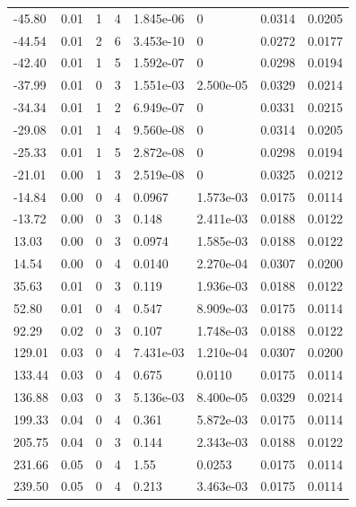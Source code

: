 \documentclass[preview]{standalone}
\begin{document}
{{\begin{tabular}{L{1.2cm}C{1.2cm} C{0.3cm}C{0.5cm} C{1.4cm}C{1.4cm} C{1.4cm}C{1.4cm}}
  -45.80  &  0.01  & 1     &  4 &  1.845e-06  & 0  & 0.0314 &  0.0205   \\ 
  -44.54  &  0.01  & 2     &  6 &  3.453e-10  & 0  & 0.0272 &  0.0177   \\ 
  -42.40  &  0.01  & 1     &  5 &  1.592e-07  & 0  & 0.0298 &  0.0194   \\ 
  -37.99  &  0.01  & 0     &  3 &  1.551e-03  & 2.500e-05  & 0.0329 &  0.0214   \\ 
  -34.34  &  0.01  & 1     &  2 &  6.949e-07  & 0  & 0.0331 &  0.0215   \\ 
  -29.08  &  0.01  & 1     &  4 &  9.560e-08  & 0  & 0.0314 &  0.0205   \\ 
  -25.33  &  0.01  & 1     &  5 &  2.872e-08  & 0  & 0.0298 &  0.0194   \\ 
  -21.01  &  0.00  & 1     &  3 &  2.519e-08  & 0  & 0.0325 &  0.0212   \\ 
  -14.84  &  0.00  & 0     &  4 &  0.0967  & 1.573e-03  & 0.0175 &  0.0114   \\ 
  -13.72  &  0.00  & 0     &  3 &  0.148  & 2.411e-03  & 0.0188 &  0.0122   \\ 
  13.03  &  0.00  & 0     &  3 &  0.0974  & 1.585e-03  & 0.0188 &  0.0122   \\ 
  14.54  &  0.00  & 0     &  4 &  0.0140  & 2.270e-04  & 0.0307 &  0.0200   \\ 
  35.63  &  0.01  & 0     &  3 &  0.119  & 1.936e-03  & 0.0188 &  0.0122   \\ 
  52.80  &  0.01  & 0     &  4 &  0.547  & 8.909e-03  & 0.0175 &  0.0114   \\ 
  92.29  &  0.02  & 0     &  3 &  0.107  & 1.748e-03  & 0.0188 &  0.0122   \\ 
  129.01  &  0.03  & 0     &  4 &  7.431e-03  & 1.210e-04  & 0.0307 &  0.0200   \\ 
  133.44  &  0.03  & 0     &  4 &  0.675  & 0.0110  & 0.0175 &  0.0114   \\ 
  136.88  &  0.03  & 0     &  3 &  5.136e-03  & 8.400e-05  & 0.0329 &  0.0214   \\ 
  199.33  &  0.04  & 0     &  4 &  0.361  & 5.872e-03  & 0.0175 &  0.0114   \\ 
  205.75  &  0.04  & 0     &  3 &  0.144  & 2.343e-03  & 0.0188 &  0.0122   \\ 
  231.66  &  0.05  & 0     &  4 &  1.55  & 0.0253  & 0.0175 &  0.0114   \\ 
  239.50  &  0.05  & 0     &  4 &  0.213  & 3.463e-03  & 0.0175 &  0.0114   \\ 

\end{tabular}}}
\end{document}
